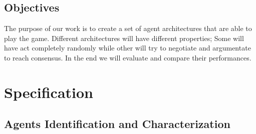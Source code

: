 \documentclass{article}
\begin{document}
\subsection{Objectives}

The purpose of our work is to create a set of agent architectures that are able to play the game. Different architectures will have different properties; Some will have act completely randomly while other will try to negotiate and argumentate to reach consensus. In the end we will evaluate and compare their performances.


\section{Specification}

\subsection{Agents Identification and Characterization}
\end{document}
